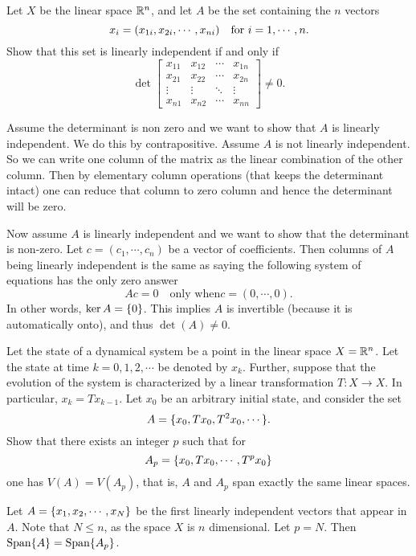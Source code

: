 \begin{problem}
	Let $ X $ be the linear space $ \mathbb{R}^n $, and let $ A $ be the set containing the $ n $ vectors
	\[ x_i = (x_{1i},x_{2i},\cdots,x_{ni}) \quad \text{for $ i=1,\cdots, n $}. \]
	Show that this set is linearly independent if and only if
	\[ \det\begin{bmatrix}
		x_{11} & x_{12} &  \cdots & x_{1n} \\
		x_{21} & x_{22} & \cdots & x_{2n} \\
		\vdots & \vdots & \ddots & \vdots \\
		x_{n1} & x_{n2} & \cdots & x_{nn}
	\end{bmatrix} \neq 0.\]
\end{problem}
\begin{solution}
	Assume the determinant is non zero and we want to show that $ A $ is linearly independent. We do this by contrapositive. Assume $ A $ is not linearly independent. So we can write one column of the matrix as the linear combination of the other column. Then by elementary column operations (that keeps the determinant intact) one can reduce that column to zero column and hence the determinant will be zero.
	
	Now assume $ A $ is linearly independent and we want to show that the determinant is non-zero. Let $ c=(c_1,\cdots,c_n) $ be a vector of coefficients. Then columns of $ A $ being linearly independent is the same as saying the following system of equations has the only zero answer
	\[ Ac = 0 \quad \text{only when} c=(0,\cdots,0). \]
	In other words, $ \ker A = \{0\} $. This implies $ A $ is invertible (because it is automatically onto), and thus $ \det(A) \neq 0. $
\end{solution}




\begin{problem}
	Let the state of a dynamical system be a point in the linear space $ X = \mathbb{R}^n $. Let the state at time $ k=0,1,2,\cdots $ be denoted by $ x_k $. Further, suppose that the evolution of the system is characterized by a linear transformation $ T:X\to X $. In particular, $ x_k = Tx_{k-1} $. Let $ x_0 $ be an arbitrary initial state, and consider the set
	\[ A = \{x_0, Tx_0, T^2x_0,\cdots\}. \]
	Show that there exists an integer $ p $ such that for
	\[ A_p = \{x_0,Tx_0,\cdots,T^px_0\} \]
	one has $ V(A) = V(A_p) $, that is, $ A $ and $ A_p $ span exactly the same linear spaces.
\end{problem}

\begin{solution}
	Let $ A = \{x_1,x_2,\cdots,x_N\} $ be the first linearly independent vectors that appear in $ A $. Note that $ N\leq n $, as the space $ X $ is $ n $ dimensional. Let $ p=N $. Then $ \operatorname{Span}\{A\} = \operatorname{Span}\{A_p\} $.
\end{solution}


